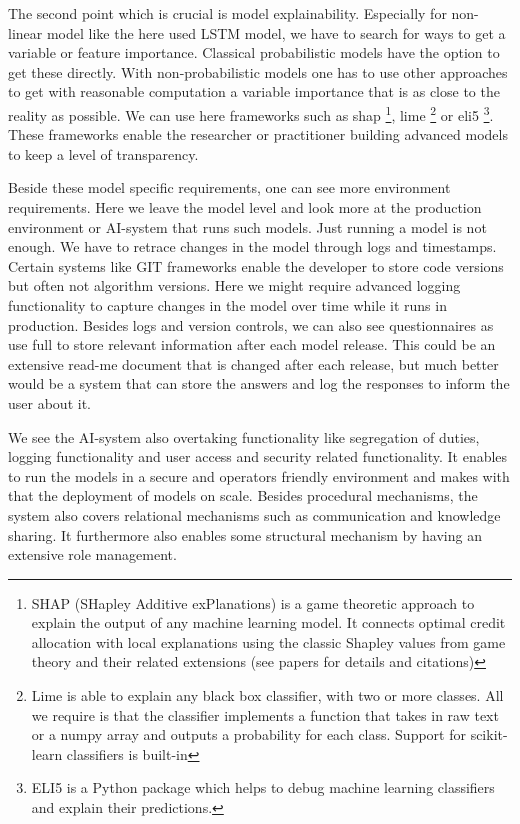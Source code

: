 \documentclass[jou,apacite]{apa6}
\begin{document}
The second point which is crucial is model explainability. Especially for non-linear model like the here used LSTM model, we have to search for ways to get a variable or feature importance. Classical probabilistic models have the option to get these directly. With non-probabilistic models one has to use other approaches to get with reasonable computation a variable importance that is as close to the reality as possible. We can use here frameworks such as shap \footnote{SHAP (SHapley Additive exPlanations) is a game theoretic approach to explain the output of any machine learning model. It connects optimal credit allocation with local explanations using the classic Shapley values from game theory and their related extensions (see papers for details and citations)}, lime \footnote{Lime is able to explain any black box classifier, with two or more classes. All we require is that the classifier implements a function that takes in raw text or a numpy array and outputs a probability for each class. Support for scikit-learn classifiers is built-in} or eli5 \footnote{ELI5 is a Python package which helps to debug machine learning classifiers and explain their predictions.}. These frameworks enable the researcher or practitioner building advanced models to keep a level of transparency.\par

Beside these model specific requirements, one can see more environment requirements. Here we leave the model level and look more at the production environment or AI-system that runs such models. Just running a model is not enough. We have to retrace changes in the model through logs and timestamps. Certain systems like GIT frameworks enable the developer to store code versions but often not algorithm versions. Here we might require advanced logging functionality to capture changes in the model over time while it runs in production. Besides logs and version controls, we can also see questionnaires as use full to store relevant information after each model release. This could be an extensive read-me document that is changed after each release, but much better would be a system that can store the answers and log the responses to inform the user about it.\par

We see the AI-system also overtaking functionality like segregation of duties, logging functionality and user access and security related functionality. It enables to run the models in a secure and operators friendly environment and makes with that the deployment of models on scale. Besides procedural mechanisms, the system also covers relational mechanisms such as communication and knowledge sharing. It furthermore also enables some structural mechanism by having an extensive role management.
\end{document}
